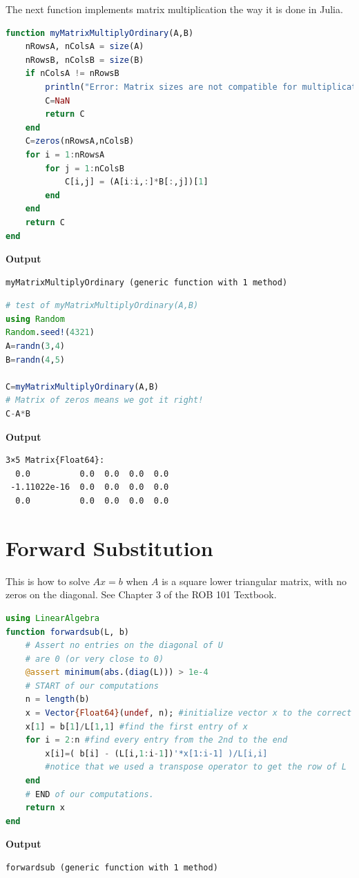 The next function implements matrix multiplication the way it is done in Julia.\\


\begin{lstlisting}[language=Julia,style=mystyle]
function myMatrixMultiplyOrdinary(A,B)
    nRowsA, nColsA = size(A)
    nRowsB, nColsB = size(B)
    if nColsA != nRowsB
        println("Error: Matrix sizes are not compatible for multiplication")
        C=NaN
        return C
    end
    C=zeros(nRowsA,nColsB)
    for i = 1:nRowsA
        for j = 1:nColsB
            C[i,j] = (A[i:i,:]*B[:,j])[1]
        end
    end
    return C
end
\end{lstlisting}
\textbf{Output} 
\begin{verbatim}
myMatrixMultiplyOrdinary (generic function with 1 method)
\end{verbatim}


\begin{lstlisting}[language=Julia,style=mystyle]
# test of myMatrixMultiplyOrdinary(A,B)
using Random
Random.seed!(4321)
A=randn(3,4)
B=randn(4,5)

C=myMatrixMultiplyOrdinary(A,B)
# Matrix of zeros means we got it right!
C-A*B
\end{lstlisting}
\textbf{Output} 
\begin{verbatim}
3×5 Matrix{Float64}:
  0.0          0.0  0.0  0.0  0.0
 -1.11022e-16  0.0  0.0  0.0  0.0
  0.0          0.0  0.0  0.0  0.0
\end{verbatim}




\section{Forward Substitution}

This is how to solve $Ax = b$ when $A$ is a square lower triangular matrix, with no zeros on the diagonal. See Chapter 3 of the ROB 101 Textbook.

\begin{lstlisting}[language=Julia,style=mystyle]
using LinearAlgebra
function forwardsub(L, b)
    # Assert no entries on the diagonal of U
    # are 0 (or very close to 0)
    @assert minimum(abs.(diag(L))) > 1e-4
    # START of our computations
    n = length(b)
    x = Vector{Float64}(undef, n); #initialize vector x to the correct size
    x[1] = b[1]/L[1,1] #find the first entry of x
    for i = 2:n #find every entry from the 2nd to the end
        x[i]=( b[i] - (L[i,1:i-1])'*x[1:i-1] )/L[i,i] 
        #notice that we used a transpose operator to get the row of L
    end
    # END of our computations.
    return x
end
\end{lstlisting}
\textbf{Output} 
\begin{verbatim}
forwardsub (generic function with 1 method)
\end{verbatim}

